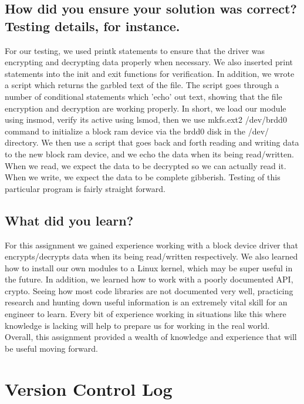 \documentclass[onecolumn, draftclsnofoot,10pt, compsoc]{IEEEtran}
\begin{document}
\subsection{How did you ensure your solution was correct? Testing details, for instance.}
\noindent For our testing, we used printk statements to ensure that the driver was encrypting and decrypting data properly when necessary. We also inserted print statements into the init and exit functions for verification. In addition, we wrote a script which returns the garbled text of the file. The script goes through a number of conditional statements which 'echo' out text, showing that the file encryption and decryption are working properly. In short, we load our module using insmod, verify its active using lsmod, then we use mkfs.ext2 /dev/brdd0 command to initialize a block ram device via the brdd0 disk in the /dev/ directory. We then use a script that goes back and forth reading and writing data to the new block ram device, and we echo the data when its being read/written. When we read, we expect the data to be decrypted so we can actually read it. When we write, we expect the data to be complete gibberish. Testing of this particular program is fairly straight forward.
\\

\subsection{What did you learn?}
\noindent For this assignment we gained experience working with a block device driver that encrypts/decrypts data when its being read/written respectively. We also learned how to install our own modules to a Linux kernel, which may be super useful in the future. In addition, we learned how to work with a poorly documented API, crypto. Seeing how most code libraries are not documented very well, practicing research and hunting down useful information is an extremely vital skill for an engineer to learn. Every bit of experience working in situations like this where knowledge is lacking will help to prepare us for working in the real world. Overall, this assignment provided a wealth of knowledge and experience that will be useful moving forward.

\section{Version Control Log}
\end{document}
